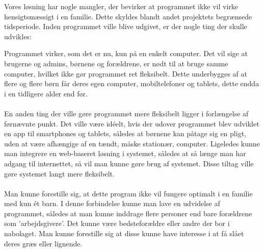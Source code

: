 Vores løsning har nogle mangler, der bevirker at programmet ikke vil virke hensigtsmæssigt i en familie. Dette skyldes blandt andet projektets begrænsede tidsperiode. Inden programmet ville blive udgivet, er der nogle ting der skulle udvikles:

Programmet virker, som det er nu, kun på en enkelt computer. Det vil sige at brugerne og admins, børnene og forældrene, er nødt til at bruge samme computer, hvilket ikke gør programmet ret fleksibelt. Dette underbygges af at flere og flere børn får deres egen computer, mobiltelefoner og tablets, dette endda i en tidligere alder end før.\cite{MobilAlder}\\
\\
En anden ting der ville gøre programmet mere fleksibelt ligger i forlængelse af førnævnte punkt. Det ville være idéelt, hvis der udover programmet blev udviklet en app til smartphones og tablets, således at børnene kan påtage sig en pligt, uden at være afhængige af en tændt, måske stationær, computer. Ligeledes kunne man integrere en web-baseret løsning i systemet, således at så længe man har adgang til internettet, så vil man kunne gøre brug af systemet. Disse tiltag ville gøre systemet langt mere fleksibelt.\\
\\
Man kunne forestille sig, at dette program ikke vil fungere optimalt i en familie med kun ét barn. I denne forbindelse kunne man lave en udvidelse af programmet, således at man kunne inddrage flere personer end bare forældrene som 'arbejdsgivere'. Det kunne være bedsteforældre eller andre der bor i nabolaget. Man kunne forestille sig at disse kunne have interesse i at få slået deres græs eller lignende.

